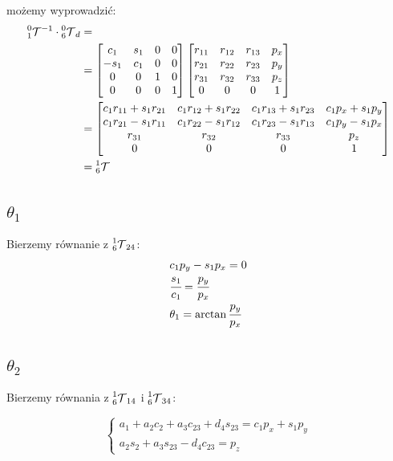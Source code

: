 \documentclass[]{article}
\newcommand\T{\mathcal{T}}
\begin{document}
możemy wyprowadzić:
\begin{align*}
\prescript{0}{1}{\T}^{-1} \cdot \prescript{0}{6}{\T}_d &= \\
&= \begin{bmatrix}
c_1 & s_1 & 0 & 0 \\
-s_1 & c_1 & 0 & 0 \\
0 & 0 & 1 & 0 \\
0 & 0 & 0 & 1
\end{bmatrix}\begin{bmatrix}
r_{11} & r_{12} & r_{13} & p_x \\
r_{21} & r_{22} & r_{23} & p_y \\
r_{31} & r_{32} & r_{33} & p_z \\
0 & 0 & 0 & 1
\end{bmatrix} \\
&= \begin{bmatrix}
c_1r_{11} + s_1r_{21} & c_1r_{12} + s_1r_{22} & c_1r_{13} + s_1r_{23} & c_1p_x + s_1p_y \\
c_1r_{21} - s_1r_{11} & c_1r_{22} - s_1r_{12} & c_1r_{23} - s_1r_{13} & c_1p_y - s_1p_x \\
r_{31} & r_{32} & r_{33} & p_z \\
0 & 0 & 0 & 1
\end{bmatrix} \\
&= \prescript{1}{6}{\T}
\end{align*}

\subsection{$\theta_1$}
Bierzemy równanie z $\prescript{1}{6}{\T}_{24}$:
\[\begin{array}{l}
c_1p_y - s_1p_x = 0 \\
\cfrac{s_1}{c_1} = \cfrac{p_y}{p_x} \\
\theta_1 = \arctan \cfrac{p_y}{p_x}
\end{array}\]

\subsection{$\theta_2$}
Bierzemy równania z $\prescript{1}{6}{\T}_{14}$ i $\prescript{1}{6}{\T}_{34}$:

\[\left\{\begin{array}{l}
a_1 + a_2c_2 + a_3c_{23} + d_4s_{23} = c_1p_x + s_1p_y \\
a_2s_2 + a_3s_{23} - d_4c_{23} = p_z
\end{array}\right.\]
\end{document}

